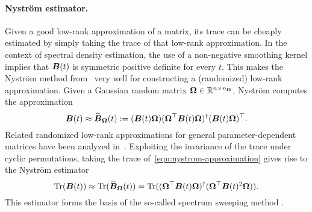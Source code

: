 \paragraph{Nyström estimator.} Given a good low-rank approximation of a matrix, its trace can be cheaply estimated by simply taking the trace of that low-rank approximation. In the context of  spectral density estimation, the use of a non-negative smoothing kernel implies that $\boldsymbol{B}(t)$ is symmetric positive definite for every $t$. This makes the Nyström method
from~\cite{gittens-2013-revisiting-nystrom} very well for constructing a (randomized) low-rank approximation.
Given a Gaussian random matrix $\boldsymbol{\Omega} \in \mathbb{R}^{n \times n_{\boldsymbol{\Omega}}}$, Nyström computes the approximation
\begin{equation}
    \boldsymbol{B}(t) \approx \widehat{\boldsymbol{B}}_{\boldsymbol{\Omega}}(t) := (\boldsymbol{B}(t) \boldsymbol{\Omega}) (\boldsymbol{\Omega}^{\top} \boldsymbol{B}(t) \boldsymbol{\Omega})^{\dagger} (\boldsymbol{B}(t) \boldsymbol{\Omega})^{\top}.
    \label{equ:nystrom-approximation}
\end{equation}
Related randomized low-rank approximations for general parameter-dependent matrices have been analyzed in~\cite{kressner-2024-randomized-lowrank}.
Exploiting the invariance of the trace under cyclic permutations, taking the trace of~\eqref{equ:nystrom-approximation} gives rise to the Nyström estimator
\begin{equation}
    \operatorname{Tr}(\boldsymbol{B}(t)) \approx \operatorname{Tr}(\widehat{\boldsymbol{B}}_{\boldsymbol{\Omega}}(t)) = \operatorname{Tr}( (\boldsymbol{\Omega}^{\top} \boldsymbol{B}(t) \boldsymbol{\Omega})^{\dagger} ( \boldsymbol{\Omega}^{\top} \boldsymbol{B}(t)^2 \boldsymbol{\Omega})).
    \label{equ:nystrom-trace-estimator}
\end{equation}
This estimator forms the basis of the so-called spectrum sweeping method \cite{lin-2017-randomized-estimation}. 


%
%

